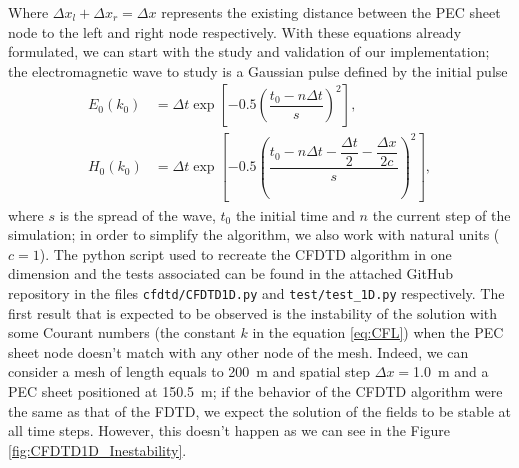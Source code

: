 \documentclass[12pt, oneside]{book}
\begin{document}
Where $\Delta x_l + \Delta x_r = \Delta x$ represents the existing distance between the PEC sheet node to the left and right node respectively. With these equations already formulated, we can start with the study and validation of our implementation; the electromagnetic wave to study is a Gaussian pulse defined by the initial pulse
\begin{align}
    E_0 (k_0) &= \Delta t  \exp \left[-0.5 \left( \dfrac{t_0 - n \Delta t}{s} \right)^2 \right], \\
    H_0 (k_0) &= \Delta t  \exp \left[-0.5 \left( \dfrac{t_0 - n \Delta t - \dfrac{\Delta t}{2} - \dfrac{\Delta x}{2c}}{s} \right)^2 \right],
\end{align}
where $s$ is the spread of the wave, $t_0$ the initial time and $n$ the current step of the simulation; in order to simplify the algorithm, we also work with natural units ($c=1$). The python script used to recreate the CFDTD algorithm in one dimension and the tests associated can be found in the attached GitHub repository in the files \texttt{cfdtd/CFDTD1D.py} and \texttt{test/test\_1D.py} respectively. The first result that is expected to be observed is the instability of the solution with some Courant numbers (the constant $k$ in the equation \ref{eq:CFL}) when the PEC sheet node doesn't match with any other node of the mesh. Indeed, we can consider a mesh of length equals to \qty{200}{\metre} and spatial step $\Delta x =$\qty{1.0}{\metre} and a PEC sheet positioned at \qty{150.5}{\metre}; if the behavior of the CFDTD algorithm were the same as that of the FDTD, we expect the solution of the fields to be stable at all time steps. However, this doesn't happen as we can see in the Figure \ref{fig:CFDTD1D_Inestability}.
\end{document}
